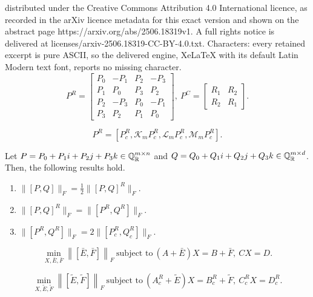 \documentclass[10pt,a4paper]{amsart}
\def \QR{\mathbb{Q}_\mathbb{R}}
\def \i{\textit{\textbf{i}}}
\def \j{\textit{\textbf{j}}}
\def \k{\textit{\textbf{k}}}
\newcommand\norm[1]{\left\lVert#1\right\rVert}
\begin{document}
distributed under the Creative Commons Attribution 4.0 International licence, as recorded in the arXiv licence metadata for this exact version and shown on the abstract page https://arxiv.org/abs/2506.18319v1. A full rights notice is delivered at licenses/arxiv-2506.18319-CC-BY-4.0.txt. Characters: every retained excerpt is pure ASCII, so the delivered engine, XeLaTeX with its default Latin Modern text font, reports no missing character.
\begin{equation}\label{eq2.2}
	P^R= \begin{bmatrix}
		P_0  &  -P_1  &  P_2  &  -P_3 \\
		P_1   &   P_0  &  P_3  &   P_2  \\
		P_2   &  -P_3 & P_0  &  -P_1  \\
		P_3  &  P_2  &  P_1  &  P_0 
	\end{bmatrix}, ~ P^C= \begin{bmatrix}
		R_1 & R_2 \\
		R_2 & R_1 
	\end{bmatrix}.
\end{equation}

\begin{equation}\label{eq2.3}
	P^R= [P_c^R, \mathcal{K}_m P_c^R, \mathcal{L}_m P_c^R, \mathcal{M}_m P_c^R].  
\end{equation}

\begin{lemma}\label{lem2}
	Let $P= P_0+ P_1\i+ P_2\j+ P_3\k \in \QR^{m \times n}$ and $Q= Q_0+ Q_1\i+ Q_2\j+ Q_3\k \in \QR^{m \times d}$. Then, the following results hold.
	\begin{enumerate}
		 \item[\rm (i)] $\|[P, Q]\|_F= \frac{1}{2}\|[P, Q]^R\|_F$.
		 \item[\rm (ii)] $\|[P, Q]^R\|_F= \|[P^R, Q^R]\|_F$.
		\item[\rm (iii)] $\|[P^R, Q^R]\|_F= 2\|[P_c^R, Q_c^R]\|_F$.
	\end{enumerate}
\end{lemma}

\begin{equation}\label{eq3.3}
	\min_{X,\bar{E},\bar{F}}\norm{[\bar{E}, \bar{F}]}_F ~ \textrm{subject to} ~  (A+\bar{E})X = B+\bar{F}, ~ CX=D. 
\end{equation} 

\begin{equation}\label{eq3.4}
	\min_{X,\widetilde{E}, \widetilde{F}} \norm{[\widetilde{E}, \widetilde{F}]}_F ~ \textrm{subject to} ~ (A^R_c+\widetilde{E})X=B^R_c+ \widetilde{F}, ~ C^R_cX=D^R_c.
\end{equation}
\end{document}
